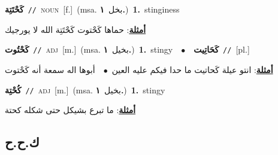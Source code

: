 \documentclass[10pt,a4paper,twoside]{article} %
\begin{document}
\begin{multicols}{2}
{\setlength\topsep{0pt}\textbf{\foreignlanguage{arabic}{كَحْتَتِة}}\ {\color{gray}\texttt{//}\color{black}}\ \textsc{noun}\ [f.]\ \color{gray}(msa. \foreignlanguage{arabic}{بخل}~\foreignlanguage{arabic}{\textbf{١.}})\color{black}\ \textbf{1.}~stinginess\  \begin{flushright}\color{gray}\foreignlanguage{arabic}{\textbf{\underline{\foreignlanguage{arabic}{أمثلة}}}: حماها كَحْتوت كَحْتَتِة الله لا يورجيك}\end{flushright}\color{black}} \vspace{2mm}

{\setlength\topsep{0pt}\textbf{\foreignlanguage{arabic}{كَحْتُوت}}\ {\color{gray}\texttt{//}\color{black}}\ \textsc{adj}\ [m.]\ \color{gray}(msa. \foreignlanguage{arabic}{بخيل}~\foreignlanguage{arabic}{\textbf{١.}})\color{black}\ \textbf{1.}~stingy\ \ $\bullet$\ \ \setlength\topsep{0pt}\textbf{\foreignlanguage{arabic}{كَحَاتِيت}}\ {\color{gray}\texttt{//}\color{black}}\ [pl.]\  \begin{flushright}\color{gray}\foreignlanguage{arabic}{\textbf{\underline{\foreignlanguage{arabic}{أمثلة}}}: انتو عيلة كَحاتيت ما حدا فيكم عليه العين\ $\bullet$\ \  أبوها اله سمعة أنه كَحْتوت}\end{flushright}\color{black}} \vspace{2mm}

{\setlength\topsep{0pt}\textbf{\foreignlanguage{arabic}{كُحْتِة}}\ {\color{gray}\texttt{//}\color{black}}\ \textsc{adj}\ [m.]\ \color{gray}(msa. \foreignlanguage{arabic}{بخيل}~\foreignlanguage{arabic}{\textbf{١.}})\color{black}\ \textbf{1.}~stingy\  \begin{flushright}\color{gray}\foreignlanguage{arabic}{\textbf{\underline{\foreignlanguage{arabic}{أمثلة}}}: ما تبرع بشيكل حتى شكله كحتة}\end{flushright}\color{black}} \vspace{2mm}

\vspace{-3mm}
\subsection*{\color{blue}\foreignlanguage{arabic}{ك.ح.ح}\color{blue}{}} 


\end{multicols}
\end{document}
